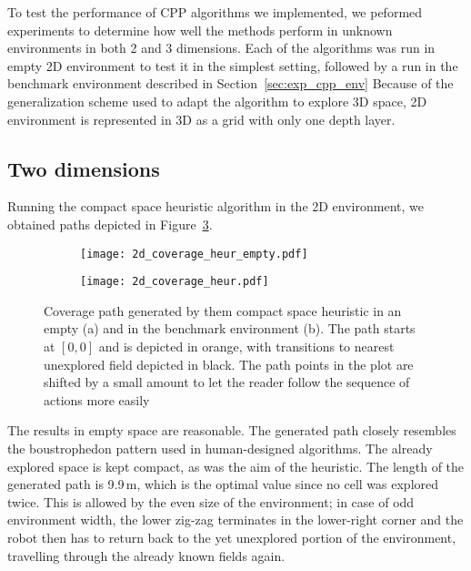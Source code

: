 \documentclass[buriama8_dp.tex]{subfiles}
\begin{document}
To test the performance of CPP algorithms we implemented, we peformed experiments to determine how well the methods perform in unknown environments in both 2 and 3 dimensions. Each of the algorithms was run in empty 2D environment to test it in the simplest setting, followed by a run in the benchmark environment described in Section~\ref{sec:exp_cpp_env} Because of the generalization scheme used to adapt the algorithm to explore 3D space, 2D environment is represented in 3D as a grid with only one depth layer.

\subsection{Two dimensions}
\label{subsec:2d_sim}

Running the compact space heuristic algorithm in the 2D environment, we obtained paths depicted in Figure~\ref{fig:heur_2d_coverage}.

\begin{figure}[ht]
  \centering
  \begin{subfigure}[t]{0.49\textwidth}
    \texttt{[image: 2d\_coverage\_heur\_empty.pdf]}
    \caption{}
    \label{fig:heur_2d_empty}
  \end{subfigure}
  \begin{subfigure}[t]{0.49\textwidth}
    \texttt{[image: 2d\_coverage\_heur.pdf]}
    \caption{}
    \label{fig:heur_2d_env}
  \end{subfigure}
  
  \caption[Coverage path -- compact space heuristic in 2D]{Coverage path generated by them compact space heuristic in an empty (a) and in the benchmark environment (b). The path starts at \([0,0]\) and is depicted in orange, with transitions to nearest unexplored field depicted in black. The path points in the plot are shifted by a small amount to let the reader follow the sequence of actions more easily}
  \label{fig:heur_2d_coverage}
\end{figure}

The results in empty space are reasonable. The generated path closely resembles the boustrophedon pattern used in human-designed algorithms. The already explored space is kept compact, as was the aim of the heuristic. The length of the generated path is 9.9\,m, which is the optimal value since no cell was explored twice. This is allowed by the even size of the environment; in case of odd environment width, the lower zig-zag terminates in the lower-right corner and the robot then has to return back to the yet unexplored portion of the environment, travelling through the already known fields again.
\end{document}
